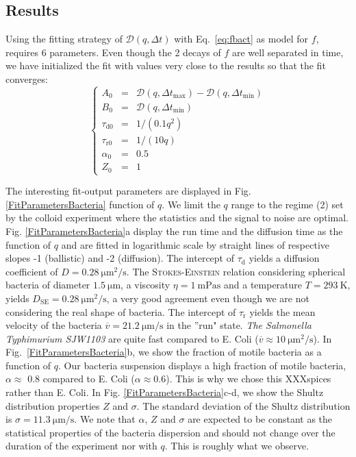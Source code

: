 \documentclass[prb,reprint,amsmath,amssymb]{revtex4-1}
\newcommand{\tg}[1]{{\color{magenta}#1}} %
\begin{document}
\subsection{Results}
\tg {Using the fitting strategy of $\mathcal{D}(q, \Delta t)$} with Eq.~\eqref{eq:fbact} as model for $f$, requires 6 parameters. Even though the 2 decays of $f$ are well separated in time, we have initialized the fit with values very close to the results so that the fit converges:
\begin{equation}
\left\{
\begin{array}{rcl}
A_0 &=& \mathcal{D} (q,\Delta t_\text{max}) - \mathcal{D} (q,\Delta t_\text{min}) \\
B_0 &=& \mathcal{D} (q,\Delta t_\text{min}) \\
\tau_\text{d0} &=& 1/(0.1 q^{2})\\
\tau_\text{r0} &=& 1/(10 q)\\
\alpha_0 &=& 0.5\\
Z_0 &=& 1
\end{array}
\right.
\end{equation}

The interesting fit-output parameters are displayed in Fig. \ref{FitParametersBacteria} function of $q$. We limit the $q$ range to the regime (2) set by the colloid experiment where the statistics and the signal to noise are optimal. \tg{Fig. \ref{FitParametersBacteria}a display the run time and the diffusion time as the function of $q$ and are fitted in logarithmic scale by straight lines of respective slopes -1 (ballistic) and -2 (diffusion). The intercept of $\tau_\text{d}$ yields a diffusion coefficient of  $D = \SI{0.28}{\micro\meter\squared\per\second}$. The \textsc{Stokes-Einstein} relation considering spherical bacteria of diameter $\SI{1.5}{\micro\meter}$, a viscosity $\eta = \SI{1}{\milli\pascal\second}$ and a temperature $T=\SI{293}{\kelvin}$, yields $D_\text{SE} = \SI{0.28}{\micro\meter\squared\per\second}$, a very good agreement even though we are not considering the real shape of bacteria. The intercept of $\tau_\text{r}$  yields the mean velocity of the bacteria $\overline{v} = \SI{21.2}{\micro\meter\per\second}$ in the ''run" state. \textit{The Salmonella Typhimurium SJW1103}  are quite fast compared to E. Coli ($\overline{v} \approx \SI{10}{\micro\meter\squared\per\second}$)\cite{4_Martinez20121637}. In Fig.~\ref{FitParametersBacteria}b, we show the fraction of motile bacteria as a function of $q$. Our bacteria suspension displays a high fraction of motile bacteria, $\alpha\approx$ 0.8 compared to E. Coli ($\alpha\approx 0.6$)\cite{4_Martinez20121637}. This is why we chose this XXXspices rather than  E. Coli. In Fig. \ref{FitParametersBacteria}c-d, we show the Shultz distribution properties $Z$ and $\sigma$. The standard deviation of the  Shultz distribution is $\sigma=\SI{11.3}{\micro\meter\per\second}$. We note that $\alpha$, $Z$ and $\sigma$ are expected to be constant as the statistical properties of the bacteria dispersion and should not change over the duration of the experiment nor with $q$. This is roughly what we observe.}
\end{document}
